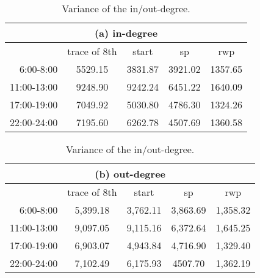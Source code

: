 \begin{table}[!h]
\caption{Variance of the in/out-degree.}\label{table_variance_out}
\centering
\begin{tabular}{r|c|c|c|c}
\hline
\multicolumn{5}{c}{(a) in-degree}\\
\hline
	&trace of 8th	&start	&sp	&rwp\\
\hline
 6:00-8:00	&
5529.15&	3831.87&	3921.02&	1357.65\\ 
 11:00-13:00&
9248.90&	9242.24&	6451.22&	1640.09\\
 17:00-19:00&
7049.92&	5030.80&	4786.30&	1324.26\\
 22:00-24:00&
7195.60&	6262.78&	4507.69&	1360.58\\
\hline
\end{tabular}
\begin{tabular}{r|c|c|c|c}
\hline
\multicolumn{5}{c}{(b) out-degree}\\
\hline
	&trace of 8th	&start	&sp	&rwp\\
\hline
 6:00-8:00	&
5,399.18&3,762.11&3,863.69&1,358.32\\
 11:00-13:00&
9,097.05&9,115.16&6,372.64&1,645.25\\
 17:00-19:00&
6,903.07&4,943.84&4,716.90&1,329.40\\
 22:00-24:00&
7,102.49&6,175.93&4507.70&1,362.19\\
\hline
\end{tabular}
\end{table}

